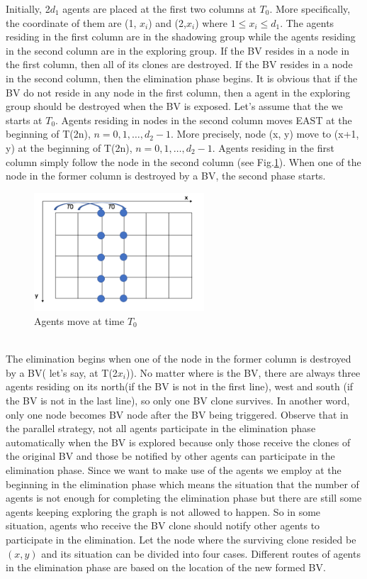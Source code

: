 Initially, 2$d_1$ agents are placed at the first two columns at $T_0$. More specifically, the coordinate of them are (1, $x_i$) and (2,$x_i$) where $1\leq x_i\leq d_1$. The agents residing in the first column are in the shadowing group while the agents residing in the second column are in the exploring group. If the BV resides in a node in the first column, then all of its clones are destroyed. If the BV resides in a node in the second column, then the elimination phase begins. It is obvious that if the BV do not reside in any node in the first column, then a agent in the exploring group should be destroyed when the BV is exposed.  Let's assume that the we starts at $T_0$. Agents residing in nodes in the second column moves EAST at the beginning of T(2n), $n=0,1, \ldots ,d_2-1$. More precisely, node (x, y) move to (x+1, y) at the beginning of T(2n), $n=0,1, \dots , d_2-1$. Agents residing in the first column simply follow the node in the second column (see  Fig.\ref{fig:TShE}). When one of the node in the former column is destroyed by a BV, the second phase starts.
\begin{figure}[H]
  \centering  
  \includegraphics[width=2.5in]{figures/TShE.png}
  \caption{Agents move at time $T_0$}\label{fig:TShE}
\end{figure}
\\
The elimination begins when one of the node in the former column is destroyed by a BV( let's say, at T(2$x_i$)). No matter where is the BV, there are always three agents residing on its north(if the BV is not in the first line), west and south (if the BV is not in the last line), so only one BV clone survives. In another word, only one node becomes BV node after the BV being triggered.  Observe that in the parallel strategy, not all agents participate in the elimination phase automatically when the BV is explored because only those receive the clones of the original BV and those be notified by other agents can participate in the elimination phase. Since we want to make use of the agents we employ at the beginning in the elimination phase which means the situation that the number of agents is not enough for completing the elimination phase but there are still some agents keeping exploring the graph is not allowed to happen. So in some situation, agents who receive the BV clone should notify other agents to participate in the elimination.  Let the node where the surviving clone resided be $(x, y)$ and its situation can be divided into four cases. Different routes of agents in the elimination phase are based on the location of the new formed BV.
